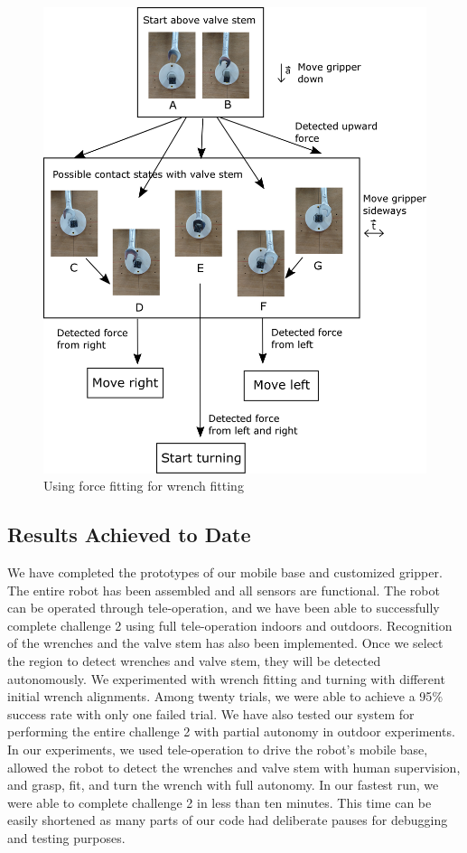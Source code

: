\documentclass{standalone}
\begin{document}
\begin{figure}
  \includegraphics[width=\columnwidth]{sections/task2/images/figure4}
  \caption{Using force fitting for wrench fitting}
  \label{fig:figure3}
\end{figure}


\subsection{Results Achieved to Date}
We have completed the prototypes of our mobile base and customized gripper. The entire robot has been assembled and all sensors are functional. The robot can be operated through tele-operation, and we have been able to successfully complete challenge 2 using full tele-operation indoors and outdoors. 
Recognition of the wrenches and the valve stem has also been implemented. Once we select the region to detect wrenches and valve stem, they will be detected autonomously.
We experimented with wrench fitting and turning with different initial wrench alignments. Among twenty trials, we were able to achieve a 95$\%$ success rate with only one failed trial. 
We have also tested our system for performing the entire challenge 2 with partial autonomy in outdoor experiments. In our experiments, we used tele-operation to drive the robot’s mobile base, allowed the robot to detect the wrenches and valve stem with human supervision, and grasp, fit, and turn the wrench with full autonomy. In our fastest run, we were able to complete challenge 2 in less than ten minutes. This time can be easily shortened as many parts of our code had deliberate pauses for debugging and testing purposes.
\end{document}
